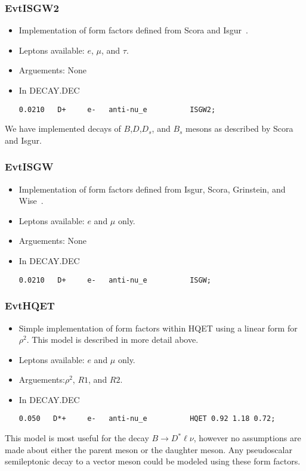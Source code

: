 \subsubsection{EvtISGW2}
\begin{itemize}
\item Implementation of form factors defined from
Scora and Isgur~\cite{Scora95}.
\item Leptons available: $e$, $\mu$, and $\tau$.
\item Arguements: None
\item In DECAY.DEC
\begin{verbatim}
0.0210   D+     e-   anti-nu_e          ISGW2;
\end{verbatim}
\end{itemize}
\noindent We have implemented decays of $B$,$D$,$D_s$, and $B_s$
mesons as described by Scora and Isgur.


\subsubsection{EvtISGW}
\begin{itemize}
\item Implementation of form factors defined from
Isgur, Scora, Grinstein, and Wise~\cite{Isgur89a}.
\item Leptons available: $e$ and $\mu$ only.
\item Arguements: None
\item In DECAY.DEC
\begin{verbatim}
0.0210   D+     e-   anti-nu_e          ISGW;
\end{verbatim}
\end{itemize}

\subsubsection{EvtHQET}
\begin{itemize}
\item Simple implementation of form factors within
HQET using a linear form for $\rho^2$.  This model is described
in more detail above. 
\item Leptons available: $e$ and $\mu$ only.
\item Arguements:$\rho^2$, $R1$, and $R2$. 
\item In DECAY.DEC
\begin{verbatim}
0.050   D*+     e-   anti-nu_e          HQET 0.92 1.18 0.72;
\end{verbatim}
\end{itemize}
\noindent This model is most useful for the decay $B \rightarrow D^* \ell \nu$,
however no assumptions are made about either the parent meson or the
daughter meson.  Any pseudoscalar semileptonic decay to a vector meson
could be modeled using these form factors.

